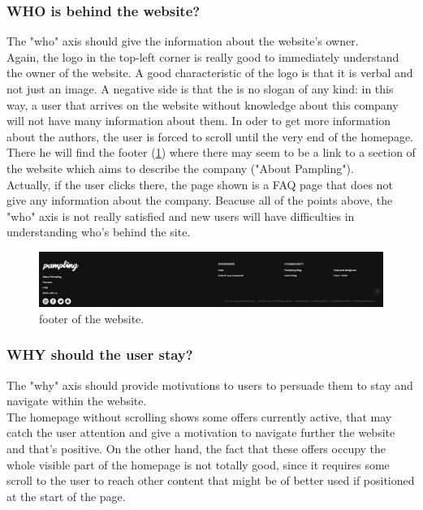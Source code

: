 \subsubsection{WHO is behind the website?} 
The "who" axis should give the information about the website's owner.\\

Again, the logo in the top-left corner is really good to immediately understand the owner of the website. 
A good characteristic of the logo is that it is verbal and not just an image. 
A negative side is that the is no slogan of any kind: in this way, a user that arrives on the website without knowledge about this company
will not have many information about them.
In oder to get more information about the authors, the user is forced to scroll until the very end of the homepage. 
There he will find the footer (\cref{fig:footer}) where there may seem to be a link to a section of the website which aims to describe the company ("About Pampling").\\
Actually, if the user clicks there, the page shown is a FAQ page that does not give any information about the company.
Beacuse all of the points above, the "who" axis is not really satisfied and new users will have difficulties in understanding who's behind the site.

\begin{figure}[h!]
	\centering
	\includegraphics[scale=0.225]{images/footer.png}
	\caption{footer of the website.}
	\label{fig:footer}
\end{figure}


\subsubsection{WHY should the user stay?} 
The "why" axis should provide motivations to users to persuade them to stay and navigate within the website.\\

The homepage without scrolling shows some offers currently active, that may catch the user attention and give a motivation to navigate further the website and that's positive.
On the other hand, the fact that these offers occupy the whole visible part of the homepage is not totally good, since it requires some scroll to the user to reach other content
that might be of better used if positioned at the start of the page.
  
